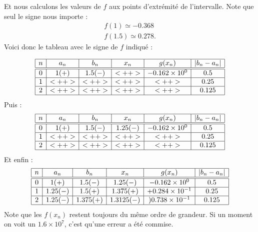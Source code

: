 \begin{example}
    Et nous calculons les valeurs de \( f\) aux points d'extrémité de l'intervalle. Note que seul le signe nous importe :
    \begin{subequations}
        \begin{align}
            f(1)\simeq -0.368\\
            f(1.5)\simeq 0.278.
        \end{align}
    \end{subequations}
    Voici donc le tableau avec le signe de \( f\) indiqué :

    \begin{equation*}
        \begin{array}[]{|c|c|c|c|c|c|}
            \hline
            n&a_n&b_n&x_n&g(x_n)&| b_n-a_n |\\
            \hline\hline
            0&1 (+)&1.5 (-)&<++>&-0.162\times 10^{0}&0.5\\
            \hline
            1&<++>&<++>&<++>&<++>&0.25\\
            \hline
            2&<++>&<++>&<++>&<++>&0.125\\
            \hline
        \end{array}
    \end{equation*}
    Puis :
    \begin{equation*}
        \begin{array}[]{|c|c|c|c|c|c|}
            \hline
            n&a_n&b_n&x_n&g(x_n)&| b_n-a_n |\\
            \hline\hline
            0&1 (+)&1.5 (-)&1.25 (-)&-0.162\times 10^{0}&0.5\\
            \hline
            1&<++>&<++>&<++>&<++>&0.25\\
            \hline
            2&<++>&<++>&<++>&<++>&0.125\\
            \hline
        \end{array}
    \end{equation*}
    Et enfin :
    \begin{equation*}
        \begin{array}[]{|c|c|c|c|c|c|}
            \hline
            n&a_n&b_n&x_n&g(x_n)&| b_n-a_n |\\
            \hline\hline
            0&1 (+)&1.5 (-)&1.25 (-)&-0.162\times 10^{0}&0.5\\
            \hline
            1&1.25 (-)&1.5(+)&1.375(+)&+0.284\times 10^{-1}&0.25\\
            \hline
            2&1.25(-)&1.375(+)&1.3125(-)&)0.738\times 10^{-1}&0.125\\
            \hline
        \end{array}
    \end{equation*}
    Note que les \( f(x_n)\) restent toujours du même ordre de grandeur. Si un moment on voit un \( 1.6\times 10^{7}\), c'est qu'une erreur a été commise.


\end{example}
